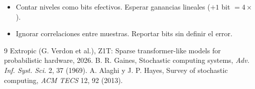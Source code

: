 \documentclass[11pt,a4paper]{article}
\begin{document}
\begin{error}
\begin{itemize}[nosep]
\item Contar niveles como bits efectivos. \quad Esperar ganancias lineales ($+1$ bit $=4\times$).
\item Ignorar correlaciones entre muestras. \quad Reportar bits sin definir el error.
\end{itemize}
\end{error}

\begin{thebibliography}{9}\small
{} Extropic (G. Verdon et al.), Z1T: Sparse transformer-like models for probabilistic hardware, 2026.
 B. R. Gaines, Stochastic computing systems, \emph{Adv. Inf. Syst. Sci.} 2, 37 (1969).
 A. Alaghi y J. P. Hayes, Survey of stochastic computing, \emph{ACM TECS} 12, 92 (2013).
\end{thebibliography}
\end{document}
